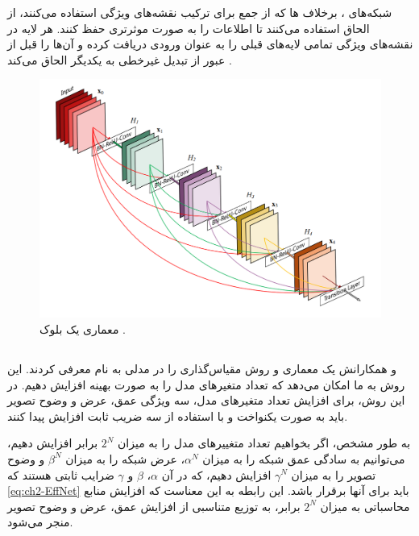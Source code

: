 شبکه‌های 
،
 برخلاف
  ‌ها که از جمع برای ترکیب نقشه‌های ویژگی استفاده می‌کنند، از الحاق 
   استفاده می‌کنند تا اطلاعات را به صورت موثرتری حفظ کنند. هر لایه در
    نقشه‌های ویژگی تمامی لایه‌های قبلی را به عنوان ورودی دریافت کرده و آن‌ها را قبل از عبور از تبدیل غیرخطی به یکدیگر الحاق می‌کند \cite{huang2017densely}.

\begin{figure}[h]
    \centering
    \includegraphics[width=1\textwidth]{Images/Chapter2/DenseNet.PNG}
    \caption{معماری یک بلوک
     \cite{huang2017densely}.}
    \label{fig:densenet_architecture}
\end{figure}






\subsection{}

\cite{tan2019efficientnet} 
 و همکارانش یک معماری و روش مقیاس‌گذاری را در مدلی به نام 
  معرفی کردند. این روش به ما امکان می‌دهد که تعداد متغیرهای مدل را به صورت بهینه افزایش دهیم. در این روش، برای افزایش تعداد متغیرهای مدل، سه ویژگی عمق، عرض و وضوح
  تصویر باید به صورت یکنواخت و با استفاده از سه ضریب ثابت افزایش پیدا کنند.

به طور مشخص، اگر بخواهیم تعداد متغییر‌های مدل را به میزان \(2^N\) برابر افزایش دهیم، می‌توانیم به سادگی عمق شبکه را به میزان \( \alpha^N \)، عرض شبکه را به میزان \( \beta^N \) و وضوح تصویر را به میزان \( \gamma^N \) افزایش دهیم، که در آن \(\alpha\)، \(\beta\) و \(\gamma\) ضرایب ثابتی هستند که 
\autoref{eq:ch2-EffNet}
باید برای آنها برقرار باشد. این رابطه به این معناست که افزایش منابع محاسباتی به میزان \(2^N\) برابر، به توزیع متناسبی از افزایش عمق، عرض و وضوح تصویر منجر می‌شود. 

